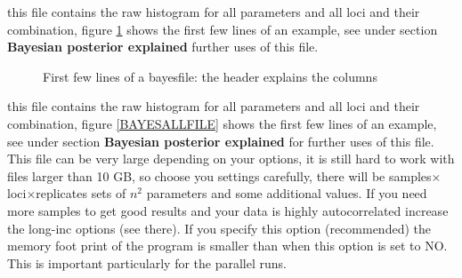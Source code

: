 \begin{description}
\item{} 
this file contains the raw histogram for all parameters and all loci and their combination, figure \ref{BAYESFILE} shows the first few lines of an example, see under section \textbf{Bayesian posterior explained} further uses of this file.
\begin{figure}[bht]

\begin{center}

\begin{boxedminipage}{6in}
\begin{small}
\end{small}
\end{boxedminipage}
\end{center}
\caption{\textsf{ First few lines of a bayesfile: the header explains the columns}}
\label{BAYESFILE}
\end{figure}

\item{}
this file contains the raw histogram for all parameters and all loci and their combination, figure \ref{BAYESALLFILE} shows the first few lines of an example, see under section \textbf{Bayesian posterior explained} for further uses of this file. This file can be very large depending on your options, it is still hard to work with files larger than 10 GB, so choose you settings carefully, there will be samples$\times$loci$\times$replicates sets of $n^2$ parameters and some additional values. If you need more samples to get good results and your data is highly autocorrelated increase the long-inc options (see there). If you specify this option (recommended) the memory foot print of the program is smaller than when this option is set to NO. This is important particularly for the parallel \migrate runs.


\end{description}
